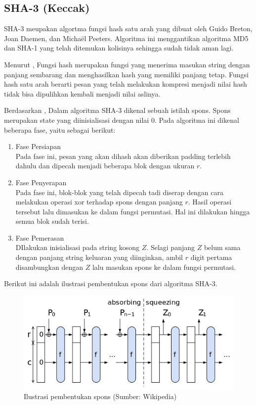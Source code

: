 \documentclass[10pt,conference]{IEEEtran}
\theoremstyle{definition}
\begin{document}
\subsection{SHA-3 (Keccak)}
SHA-3 meupakan algortma fungsi hash satu arah yang dibuat oleh Guido Breton, Joan Daemen, dan Michaël Peeters. Algoritma ini menggantikan algoritma MD5 dan SHA-1 yang telah ditemukan kolisinya sehingga sudah tidak aman lagi.

Menurut \cite{b1},  Fungsi hash merupakan fungsi yang menerima masukan string dengan panjang sembarang dan menghasilkan hash yang memiliki panjang tetap. Fungsi hash satu arah berarti pesan yang telah melakukan kompresi menjadi nilai hash tidak bisa dipulihkan kembali menjadi nilai aslinya.

Berdasarkan \cite{b1}, Dalam algoritma SHA-3 dikenal sebuah istilah spons. Spons merupakan state yang diinisialisasi dengan nilai 0. Pada algoritma ini dikenal beberapa fase, yaitu sebagai berikut: 

\begin{enumerate}
    \item Fase Persiapan \\
    Pada fase ini, pesan yang akan dihash akan diberikan padding terlebih dahulu dan dipecah menjadi beberapa blok dengan ukuran $r$. 
    \item Fase Penyerapan \\
    Pada fase ini, blok-blok yang telah dipecah tadi diserap dengan cara melakukan operasi xor terhadap spons dengan panjang $r$. Hasil operasi tersebut lalu dimasukan ke dalam fungsi permutasi. Hal ini dilakukan hingga semua blok sudah terisi.
    \item Fase Pemerasan \\
    DIlakukan inisialisasi pada string kosong $Z$. Selagi panjang $Z$ belum sama dengan panjang string keluaran yang diinginkan, ambil $r$ digit pertama disambungkan dengan $Z$ lalu masukan spons ke dalam fungsi permutasi.   
\end{enumerate}

Berikut ini adalah ilustrasi pembentukan spons dari algoritma SHA-3.

\begin{figure}[htbp]
    \centerline{\includegraphics[width=0.9\columnwidth]{fig1.png}}
    \caption{Ilustrasi pembentukan spons (Sumber: Wikipedia)}
\end{figure}
\end{document}
